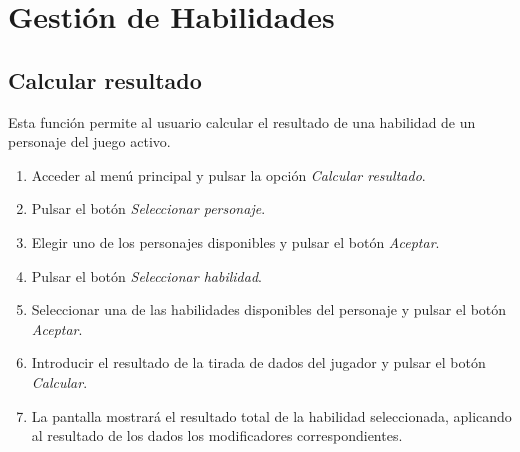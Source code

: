 
\section{Gestión de Habilidades}
\subsection{Calcular resultado}
Esta función permite al usuario calcular el resultado de una habilidad de un 
personaje del juego activo. \medskip

\begin{enumerate}
    \item Acceder al menú principal y pulsar la opción \textit{Calcular resultado}.
    \item Pulsar el botón \textit{Seleccionar personaje}.
    \item Elegir uno de los personajes disponibles y pulsar el botón \textit{Aceptar}.
    \item Pulsar el botón \textit{Seleccionar habilidad}.
    \item Seleccionar una de las habilidades disponibles del personaje y pulsar el botón \textit{Aceptar}.
    \item Introducir el resultado de la tirada de dados del jugador y pulsar el botón \textit{Calcular}.
    \item La pantalla mostrará el resultado total de la habilidad seleccionada, aplicando al resultado de los dados 
    los modificadores correspondientes.
\end{enumerate}

